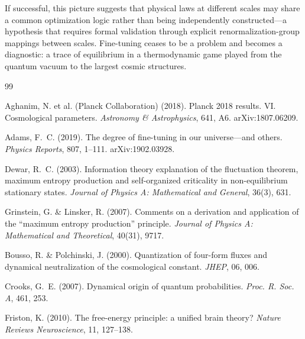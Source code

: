 \documentclass[12pt,a4paper]{article}
\theoremstyle{remark}
\begin{document}
If successful, this picture suggests that physical laws at different scales may share a common optimization logic rather than being independently constructed---a hypothesis that requires formal validation through explicit renormalization-group mappings between scales. Fine-tuning ceases to be a problem and becomes a diagnostic: a trace of equilibrium in a thermodynamic game played from the quantum vacuum to the largest cosmic structures.



\begin{thebibliography}{99}

Aghanim, N. et al. (Planck Collaboration) (2018).
\newblock Planck 2018 results. VI. Cosmological parameters.
\newblock \textit{Astronomy \& Astrophysics}, 641, A6.
\newblock arXiv:1807.06209.

Adams, F.~C. (2019).
\newblock The degree of fine-tuning in our universe---and others.
\newblock \textit{Physics Reports}, 807, 1--111.
\newblock arXiv:1902.03928.

Dewar, R.~C. (2003).
\newblock Information theory explanation of the fluctuation theorem, maximum entropy production and self-organized criticality in non-equilibrium stationary states.
\newblock \textit{Journal of Physics A: Mathematical and General}, 36(3), 631.

Grinstein, G. \& Linsker, R. (2007).
\newblock Comments on a derivation and application of the ``maximum entropy production'' principle.
\newblock \textit{Journal of Physics A: Mathematical and Theoretical}, 40(31), 9717.

Bousso, R. \& Polchinski, J. (2000).
\newblock Quantization of four-form fluxes and dynamical neutralization of the cosmological constant.
\newblock \textit{JHEP}, 06, 006.

Crooks, G.~E. (2007).
\newblock Dynamical origin of quantum probabilities.
\newblock \textit{Proc. R. Soc. A}, 461, 253.

Friston, K. (2010).
\newblock The free-energy principle: a unified brain theory?
\newblock \textit{Nature Reviews Neuroscience}, 11, 127--138.


\end{thebibliography}
\end{document}

